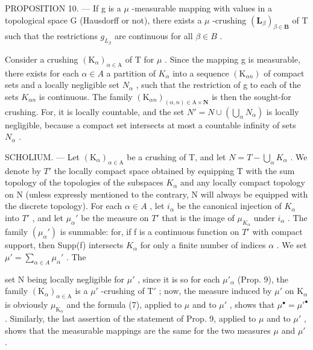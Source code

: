 PROPOSITION 10. --- If g is a \(\mu\) -measurable mapping with values in a topological space G (Hausdorff or not), there exists a \(\mu\) -crushing \((\mathbf{L}_{\beta})_{\beta\in\mathbf{B}}\) of T such that the restrictions \(g_{L_{\beta}}\) are continuous for all \(\beta\in B\) .

Consider a crushing \((\mathrm{K}_{\alpha})_{\alpha\in\mathrm{A}}\) of T for \(\mu\) . Since the mapping g is measurable, there exists for each \(\alpha\in A\) a partition of \(K_{\alpha}\) into a sequence \((\mathrm{K}_{\alpha n})\) of compact sets and a locally negligible set \(N_{\alpha}\) , such that the restriction of g to each of the sets \(K_{\alpha n}\) is continuous. The family \((\mathrm{K}_{\alpha n})_{(\alpha,n)\in\mathrm{A}\times\mathbf{N}}\) is then the sought-for crushing. For, it is locally countable, and the set \(N' = N \cup \left( \bigcup_{\alpha} N_{\alpha} \right)\) is locally negligible, because a compact set intersects at most a countable infinity of sets \(N_{\alpha}\) .

SCHOLIUM. --- Let \((\mathrm{K}_{\alpha})_{\alpha\in\mathrm{A}}\) be a crushing of T, and let \(N=T-\bigcup_{\alpha}K_{\alpha}\) . We denote by \(T'\) the locally compact space obtained by equipping T with the sum topology of the topologies of the subspaces \(K_{\alpha}\) and any locally compact topology on N (unless expressly mentioned to the contrary, N will always be equipped with the discrete topology). For each \(\alpha \in A\) , let \(i_{\alpha}\) be the canonical injection of \(K_{\alpha}\) into \(T'\) , and let \(\mu_{\alpha}'\) be the measure on \(T'\) that is the image of \(\mu_{K_{\alpha}}\) under \(i_{\alpha}\) . The family \((\mu_{\alpha}')\) is summable: for, if f is a continuous function on \(T'\) with compact support, then Supp(f) intersects \(K_{\alpha}\) for only a finite number of indices \(\alpha\) . We set \(\mu' = \sum_{\alpha \in A} \mu_{\alpha}'\) . The

set N being locally negligible for \(\mu'\) , since it is so for each \(\mu'_{\alpha}\) (Prop. 9), the family \((\mathrm{K}_{\alpha})_{\alpha \in \mathrm{A}}\) is a \(\mu'\) -crushing of \(\mathrm{T}'\) ; now, the measure induced by \(\mu'\) on \(\mathrm{K}_{\alpha}\) is obviously \(\mu_{\mathrm{K}_{\alpha}}\) and the formula (7), applied to \(\mu\) and to \(\mu'\) , shows that \(\mu^{\bullet} = \mu'^{\bullet}\) . Similarly, the last assertion of the statement of Prop. 9, applied to \(\mu\) and to \(\mu'\) , shows that the measurable mappings are the same for the two measures \(\mu\) and \(\mu'\) .

